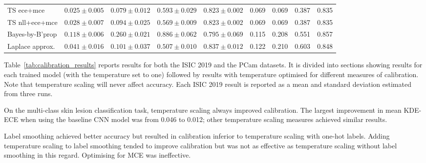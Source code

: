 \begin{table}[h!]
{\begin{tabular}{l|cccc|m{0.8cm}m{0.8cm}m{0.8cm}m{0.8cm}|}
			TS ece+mce & \multicolumn{1}{c|}{$0.025 \pm 0.005$}& \multicolumn{1}{c|}{$0.079 \pm 0.012$}& \multicolumn{1}{c|}{$0.593 \pm 0.029$}& \multicolumn{1}{c|}{$0.823 \pm 0.002$}& \multicolumn{1}{c|}{0.069} & \multicolumn{1}{c|}{0.069} & \multicolumn{1}{c|}{0.387} & \multicolumn{1}{c|}{0.835} \\
			TS nll+ece+mce & \multicolumn{1}{c|}{$0.028 \pm 0.007$}& \multicolumn{1}{c|}{$0.094 \pm 0.025$}& \multicolumn{1}{c|}{$0.569 \pm 0.009$}& \multicolumn{1}{c|}{$0.823 \pm 0.002$}& \multicolumn{1}{c|}{0.069} & \multicolumn{1}{c|}{0.069} & \multicolumn{1}{c|}{0.387} & \multicolumn{1}{c|}{0.835} \\ \hline \hline
			Bayes-by-B'prop & \multicolumn{1}{c|}{$0.118 \pm 0.006$}& \multicolumn{1}{c|}{$0.260 \pm 0.021$}& \multicolumn{1}{c|}{$0.886 \pm 0.062$}& \multicolumn{1}{c|}{$0.795 \pm 0.069$}& \multicolumn{1}{c|}{0.115} & \multicolumn{1}{c|}{0.208} & \multicolumn{1}{c|}{0.551} & \multicolumn{1}{c|}{0.857} \\ 
			Laplace approx.& \multicolumn{1}{c|}{$0.041 \pm 0.016$}& \multicolumn{1}{c|}{$0.101 \pm 0.037$}& \multicolumn{1}{c|}{$0.507 \pm 0.010$}& \multicolumn{1}{c|}{$0.837 \pm 0.012$}& \multicolumn{1}{c|}{0.122} & \multicolumn{1}{c|}{0.210} & \multicolumn{1}{c|}{0.603} & \multicolumn{1}{c|}{0.848} \\\hline
		\end{tabular}%
	}
\end{table}

Table~\ref{tab:calibration_results} reports results for both the ISIC 2019 and the PCam datasets. It is divided into sections showing results for each trained model (with the temperature set to one) followed by results with temperature optimised for different measures of calibration. Note that temperature scaling will never affect accuracy. Each ISIC 2019 result is reported as a mean and standard deviation estimated from three runs.

On the multi-class skin lesion classification task, temperature scaling always improved calibration. The largest improvement in mean KDE-ECE when using the baseline CNN model was from 0.046 to 0.012; other temperature scaling measures achieved similar results. 

Label smoothing achieved better accuracy but resulted in calibration inferior to temperature scaling with one-hot labels. Adding temperature scaling to label smoothing tended to improve calibration but was not as effective as temperature scaling without label smoothing in this regard. Optimising for MCE was ineffective. 

